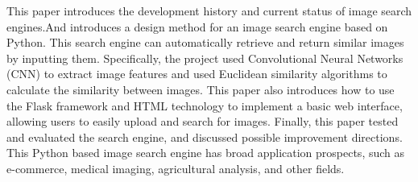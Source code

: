 
\enabstract

This paper introduces the development history and current status of image search engines.And introduces a design method for an image search engine based on Python. This search engine can automatically retrieve and return similar images by inputting them.
Specifically, the project used Convolutional Neural Networks (CNN) to extract image features and used Euclidean similarity algorithms to calculate the similarity between images. This paper also introduces how to use the Flask framework and HTML technology to implement a basic web interface, allowing users to easily upload and search for images. Finally, this paper tested and evaluated the search engine, and discussed possible improvement directions. This Python based image search engine has broad application prospects, such as e-commerce, medical imaging, agricultural analysis, and other fields.

	

